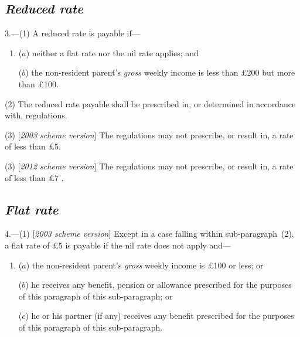 \documentclass[12pt,a4paper]{article}
\begin{document}

\subsection*{\itshape Reduced rate}

3.---(1) A reduced rate is payable if—
\begin{enumerate}\item[]
($a$) neither a flat rate nor the nil rate applies; and

($b$) the non-resident parent’s 
\emph{gross}  %
weekly income is less than £200 but more than £100. 
\end{enumerate}

(2) The reduced rate payable shall be prescribed in, or determined in accordance with, regulations.

(3) [\emph{2003 scheme version}] The regulations may not prescribe, or result in, a rate of less than £5. 

(3) [\emph{2012 scheme version}] The regulations may not prescribe, or result in, a rate of less than 
£7%
. 


\subsection*{\itshape Flat rate}

4.---(1) [\emph{2003 scheme version}] Except in a case falling within sub-paragraph~(2), a flat rate of £5 is payable if the nil rate does not apply and—
\begin{enumerate}\item[]
($a$) the non-resident parent’s 
\emph{gross}  %
weekly income is £100 or less; or

($b$) he receives any benefit, pension or allowance prescribed for the purposes of this paragraph of this sub-paragraph; or

($c$) he or his partner (if any) receives any benefit prescribed for the purposes of this paragraph of this sub-paragraph.
\end{enumerate}
\end{document}
